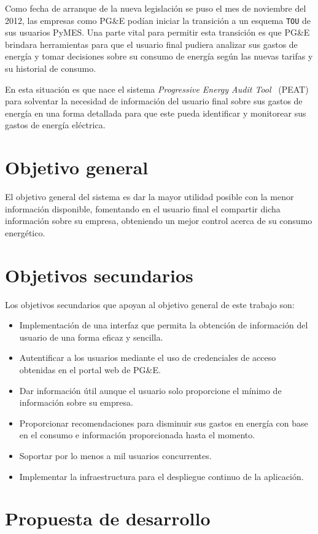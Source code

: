 Como fecha de arranque de la nueva legislación se puso el mes de noviembre del 2012,
las empresas como PG\&E podían iniciar la transición a un esquema \texttt{TOU}
de sus usuarios PyMES. Una parte vital para permitir esta transición es que
PG\&E brindara herramientas para que el usuario final pudiera analizar sus
gastos de energía y tomar decisiones sobre su consumo de energía según las
nuevas tarifas y su historial de consumo.

En esta situación es que nace el sistema \textit{Progressive
  Energy Audit Tool} \ (PEAT) para solventar la necesidad de información
del usuario final sobre sus gastos de energía en una forma detallada para
que este pueda identificar y monitorear sus gastos de energía eléctrica.

\section{Objetivo general}

El objetivo general del sistema es dar la mayor utilidad posible con la menor
información disponible, fomentando en el usuario final el compartir dicha
información sobre su empresa, obteniendo un mejor control
acerca de su consumo energético.

\section{Objetivos secundarios}

Los objetivos secundarios que apoyan al objetivo general de este trabajo son:
\begin{itemize}
\item Implementación de una interfaz que permita la obtención
  de información del usuario de una forma eficaz y sencilla.
\item Autentificar a los usuarios mediante el uso de credenciales de acceso
  obtenidas en el portal web de PG\&E.
\item Dar información útil aunque el usuario solo proporcione el
  mínimo de información sobre su empresa.
\item Proporcionar recomendaciones para disminuir sus
  gastos en energía con base en el consumo e información proporcionada
  hasta el momento.
\item Soportar por lo menos a mil usuarios concurrentes.
\item Implementar la infraestructura para el despliegue continuo de la
  aplicación.
\end{itemize}

\section{Propuesta de desarrollo}
